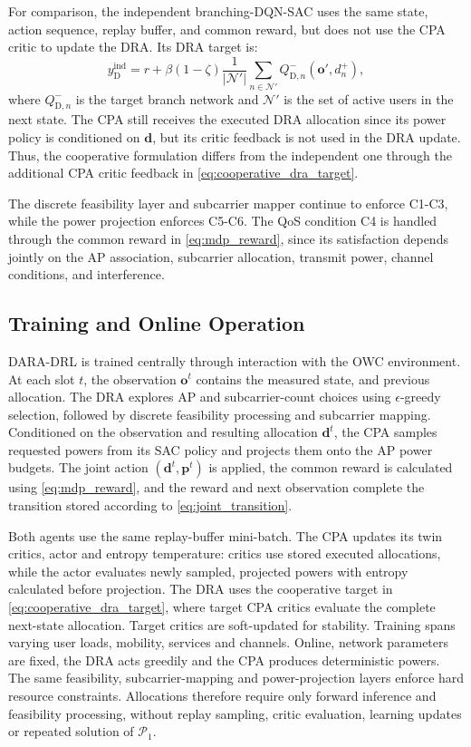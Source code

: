\documentclass[journal]{IEEEtran}
\begin{document}
For comparison, the independent branching-DQN-SAC \cite{Tavakoli2018Branching,Haarnoja2018SAC} uses the
same state, action sequence, replay buffer, and common reward, but
does not use the CPA critic to update the DRA. Its DRA target is:
\begin{equation}
y_{\mathrm{D}}^{\mathrm{ind}}
=
r
+
\beta(1-\zeta)
\frac{1}{|\mathcal{N}'|}
\sum_{n\in\mathcal{N}'}
Q_{\mathrm{D},n}^{-}
\left(
\mathbf{o}',d_n^{+}
\right),
\label{eq:independent_dra_target}
\end{equation}
where $Q_{\mathrm{D},n}^{-}$ is the target branch network and
$\mathcal{N}'$ is the set of active users in the next state. The CPA still receives the executed DRA allocation since its power policy is conditioned on $\mathbf{d}$, but its critic feedback is not used in the DRA update. Thus, the cooperative formulation differs from the
independent one through the additional CPA critic feedback in \eqref{eq:cooperative_dra_target}.

The discrete feasibility layer and subcarrier mapper continue to
enforce C1-C3, while the power projection enforces C5-C6. The QoS
condition C4 is handled through the common reward in
\eqref{eq:mdp_reward}, since its satisfaction depends jointly on the
AP association, subcarrier allocation, transmit power, channel
conditions, and interference.

\subsection{Training and Online Operation}

DARA-DRL is trained centrally through interaction with the OWC environment. At each slot $t$, the observation $\mathbf{o}^{t}$ contains the measured state, and previous allocation. The DRA explores AP and subcarrier-count choices using $\epsilon$-greedy selection, followed by discrete feasibility processing and subcarrier mapping. Conditioned on the observation and resulting allocation $\mathbf{d}^{t}$, the CPA samples requested powers from its SAC policy and projects them onto the AP power budgets. The joint action $(\mathbf{d}^{t},\mathbf{p}^{t})$ is applied,
the common reward is calculated using \eqref{eq:mdp_reward}, and the reward and next observation complete the transition stored according to \eqref{eq:joint_transition}.

Both agents use the same replay-buffer mini-batch. The CPA updates its twin critics, actor and entropy temperature: critics use stored executed allocations, while the actor evaluates newly sampled, projected powers with entropy calculated before projection. The DRA uses the cooperative target in \eqref{eq:cooperative_dra_target}, where target CPA critics evaluate the complete next-state allocation. Target critics are soft-updated for stability. Training spans varying user loads, mobility, services and channels. Online, network parameters are fixed, the DRA acts greedily and the CPA produces deterministic powers. The same feasibility, subcarrier-mapping and power-projection layers enforce hard resource constraints. Allocations therefore require only forward inference and feasibility processing, without replay sampling, critic evaluation, learning updates or repeated solution of $\mathcal{P}_{1}$.
\end{document}
